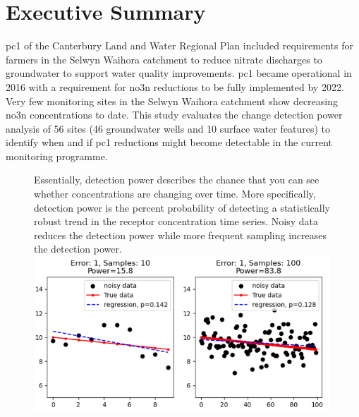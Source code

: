 \newpage

\glsresetall  %
\section*{Executive Summary} \label{exsum} %


\gls{pc1} of the Canterbury Land and Water Regional Plan included requirements for farmers in the Selwyn Waihora catchment to reduce nitrate discharges to groundwater to support water quality improvements.
\gls{pc1} became operational in 2016 with a requirement for \gls{no3n} reductions to be fully implemented by 2022.
Very few monitoring sites in the Selwyn Waihora catchment show decreasing \gls{no3n} concentrations to date.
This study evaluates the change detection power analysis of 56 sites (46 groundwater wells and 10 surface water features) to identify when and if \gls{pc1} reductions might become detectable in the current monitoring programme.

\begin{figure}
    \begin{breakawaybox}[title=What is Detection Power]{}

        Essentially, detection power describes the chance that you can see whether concentrations are changing over time.
        More specifically, detection power is the percent probability of detecting a statistically robust trend in the receptor concentration time series.
        Noisy data reduces the detection power while more frequent sampling increases the detection power.
        \\
        \includegraphics[width=0.99\textwidth]{figures/dp_ex_small}
    \end{breakawaybox}
\end{figure}

